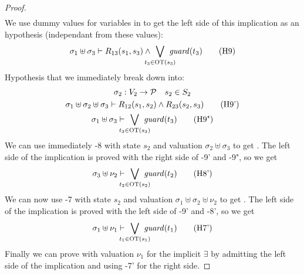 \documentclass{article}
\begin{document}
\begin{proof}
\begin{gather}
	\end{gather}
	We use dummy values for variables in  to get the left side of this implication as an hypothesis (independant from these values):
	\[ \sigma_1 \uplus \sigma_3 \vdash R_{13}\mpar{s_1, s_3} \wedge \bigvee_\subbox{t_3 \in \fOT{s_3}} \fguard{t_3} \hyp{9} \]
	Hypothesis that we immediately break down into:
	\begin{gather*}
		\sigma_2: V_2 \to \values \quad s_2 \in S_2 \\
		\sigma_1 \uplus \sigma_2 \uplus \sigma_3 \vdash R_{12}\mpar{s_1, s_2} \wedge R_{23}\mpar{s_2, s_3} \hyp{9'} \\
		\sigma_1 \uplus \sigma_3 \vdash \bigvee_\subbox{t_3 \in \fOT{s_3}} \fguard{t_3} \hyp{9"}
	\end{gather*}
	We can use immediately \hyp{8} with state \(s_2\) and valuation \(\sigma_2 \uplus \sigma_3\) to get .
	The left side of the implication is proved with the right side of \hyp{9'} and \hyp{9"}, so we get
	\[ \sigma_3 \uplus \nu_2 \vdash \bigvee_\subbox{t_2 \in \fOT{s_2}} \fguard{t_2} \hyp{8'} \]
	We can now use \hyp{7} with state \(s_2\) and valuation \(\sigma_1 \uplus \sigma_2 \uplus \nu_2\) to get .
	The left side of the implication is proved with the left side of \hyp{9'} and \hyp{8'}, so we get
	\[ \sigma_1 \uplus \nu_1 \vdash \bigvee_\subbox{t_1 \in \fOT{s_1}} \fguard{t_1} \hyp{7'} \]
	Finally we can prove  with valuation \(\nu_1\) for the implicit \(\exists\) by admitting the left side of the implication and using \hyp{7'} for the right side.
\end{proof}
\end{document}
